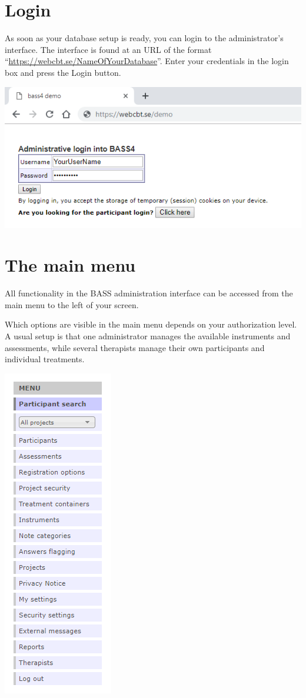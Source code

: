 \documentclass[]{book}
\begin{document}
\hypertarget{login}{%
\chapter{Login}\label{login}}

As soon as your database setup is ready, you can login to the administrator's interface. The interface is found at an URL of the format ``\url{https://webcbt.se/NameOfYourDatabase}''. Enter your credentials in the login box and press the Login button.

\includegraphics{images/login.png}

\hypertarget{the-main-menu}{%
\chapter{The main menu}\label{the-main-menu}}

All functionality in the BASS administration interface can be accessed from the main menu to the left of your screen.

Which options are visible in the main menu depends on your authorization level. A usual setup is that one administrator manages the available instruments and assessments, while several therapists manage their own participants and individual treatments.

\includegraphics{images/main-menu.png}
\end{document}
